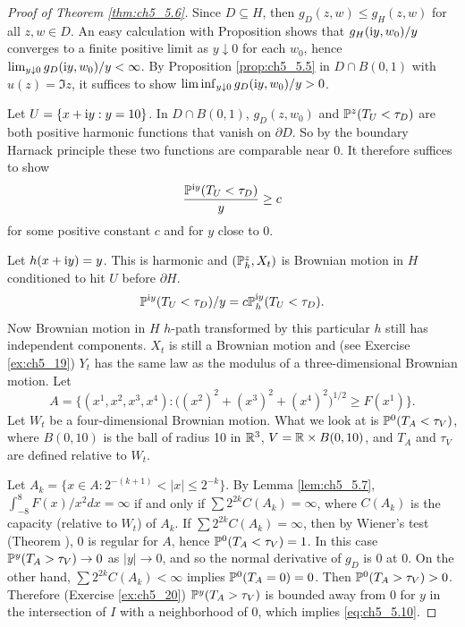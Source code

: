 \begin{proof}[Proof of Theorem \ref{thm:ch5_5.6}]
Since $D \subseteq H$, then $g_D(z,w) \leq g_H(z,w)$ for all $z,w \in \allowbreak D$. An easy calculation with Proposition  shows that $g_H(\im y,w_0)/y$ converges to a finite positive limit as $y \downarrow 0$ for each $w_0$, hence $\lim_{y \downarrow 0} g_D(\im y,w_0)/y \allowbreak < \infty$. By Proposition \ref{prop:ch5_5.5} in $D \cap B(0,1)$ with $u(z) = \Im z$, it suffices to show $\liminf_{y \downarrow 0} g_D(\im y,w_0)/y > 0$.

\mpagebreak

Let $U = \{x + \im y : y = 10\}$. In $D \cap B(0,1)$, $g_D(z,w_0)$ and $\P^z(T_U < \tau_D)$ are both positive harmonic functions that vanish on $\partial D$. So by the boundary Harnack principle these two functions are comparable near $0$. It therefore suffices to show
\begin{equation}\label{eq:ch5_5.10}
    \frac{\P^{\im y}(T_U < \tau_D)}{y} \geq c
\end{equation}
for some positive constant $c$ and for $y$ close to $0$.

Let $h(x + \im y) = y$. This is harmonic and $(\P^z_h, X_t)$ is Brownian motion in $H$ conditioned to hit $U$ before $\partial H$.
\[
    \P^{\im y}(T_U < \tau_D)/y = c\P^{\im y}_h(T_U < \tau_D).
\]
Now Brownian motion in $H$ $h$-path transformed by this particular $h$ still has independent components. $X_t$ is still a Brownian motion and (see Exercise \ref{ex:ch5_19}) $Y_t$ has the same law as the modulus of a three-dimensional Brownian motion. Let
\[
    A = \big\{(x^1,x^2,x^3,x^4) : \big((x^2)^2 + (x^3)^2 + (x^4)^2\big)^{1/2} \geq F(x^1)\big\}.
\]
Let $W_t$ be a four-dimensional Brownian motion. What we look at is $\P^0(T_A < \tau_V)$, where $B(0,10)$ is the ball of radius 10 in $\R^3$, $V = \R \times B(0,10)$, and $T_A$ and $\tau_V$ are defined relative to $W_t$.

Let $A_k = \{x \in A : 2^{-(k+1)} < |x| \leq 2^{-k}\}$. By Lemma \ref{lem:ch5_5.7}, $\int_{-8}^8 F(x)/x^2dx = \infty$ if and only if $\sum 2^{2k}C(A_k) = \infty$, where $C(A_k)$ is the capacity (relative to $W_t$) of $A_k$. If $\sum 2^{2k}C(A_k) = \infty$, then by Wiener's test (Theorem ), $0$ is regular for $A$, hence $\P^0(T_A < \tau_V) = 1$. In this case $\P^y(T_A > \tau_V) \to 0$ as $|y| \to 0$, and so the normal derivative of $g_D$ is $0$ at $0$. On the other hand, $\sum 2^{2k}C(A_k) < \infty$ implies $\P^0(T_A = 0) = 0$. Then $\P^0(T_A > \tau_V) > 0$. Therefore (Exercise \ref{ex:ch5_20}) $\P^y(T_A > \tau_V)$ is bounded away from $0$ for $y$ in the intersection of $I$ with a neighborhood of $0$, which implies \eqref{eq:ch5_5.10}.
\end{proof}

